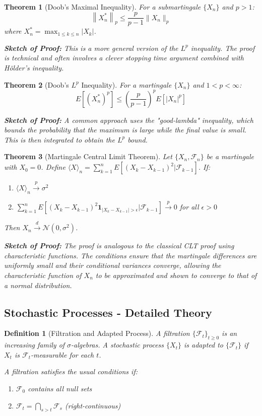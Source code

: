 \documentclass[12pt,a4paper]{article}
\newtheorem{theorem}{Theorem}[section]
\newtheorem{definition}{Definition}[section]
\theoremstyle{remark}
\begin{document}
\begin{theorem}[Doob's Maximal Inequality]
For a submartingale $\{X_n\}$ and $p > 1$:
$$\left\|X_n^*\right\|_p \leq \frac{p}{p-1} \|X_n\|_p$$
where $X_n^* = \max_{1 \leq k \leq n} |X_k|$.

\textbf{Sketch of Proof:} This is a more general version of the $L^p$ inequality. The proof is technical and often involves a clever stopping time argument combined with Hölder's inequality.
\end{theorem}

\begin{theorem}[Doob's $L^p$ Inequality]
For a martingale $\{X_n\}$ and $1 < p < \infty$:
$$E[(X_n^*)^p] \leq \left(\frac{p}{p-1}\right)^p E[|X_n|^p]$$

\textbf{Sketch of Proof:} A common approach uses the "good-lambda" inequality, which bounds the probability that the maximum is large while the final value is small. This is then integrated to obtain the $L^p$ bound.
\end{theorem}

\begin{theorem}[Martingale Central Limit Theorem]
Let $\{X_n, \mathcal{F}_n\}$ be a martingale with $X_0 = 0$. Define $\langle X \rangle_n = \sum_{k=1}^n E[(X_k - X_{k-1})^2|\mathcal{F}_{k-1}]$. If:
\begin{enumerate}
\item $\langle X \rangle_n \stackrel{p}{\to} \sigma^2$
\item $\sum_{k=1}^n E[(X_k - X_{k-1})^2 \mathbf{1}_{|X_k - X_{k-1}| > \epsilon}|\mathcal{F}_{k-1}] \stackrel{p}{\to} 0$ for all $\epsilon > 0$
\end{enumerate}
Then $X_n \stackrel{d}{\to} \mathcal{N}(0, \sigma^2)$.

\textbf{Sketch of Proof:} The proof is analogous to the classical CLT proof using characteristic functions. The conditions ensure that the martingale differences are uniformly small and their conditional variances converge, allowing the characteristic function of $X_n$ to be approximated and shown to converge to that of a normal distribution.
\end{theorem}

\subsection{Stochastic Processes - Detailed Theory}

\begin{definition}[Filtration and Adapted Process]
A filtration $\{\mathcal{F}_t\}_{t \geq 0}$ is an increasing family of $\sigma$-algebras. A stochastic process $\{X_t\}$ is adapted to $\{\mathcal{F}_t\}$ if $X_t$ is $\mathcal{F}_t$-measurable for each $t$.

A filtration satisfies the usual conditions if:
\begin{enumerate}
\item $\mathcal{F}_0$ contains all null sets
\item $\mathcal{F}_t = \bigcap_{s > t} \mathcal{F}_s$ (right-continuous)
\end{enumerate}
\end{definition}
\end{document}
